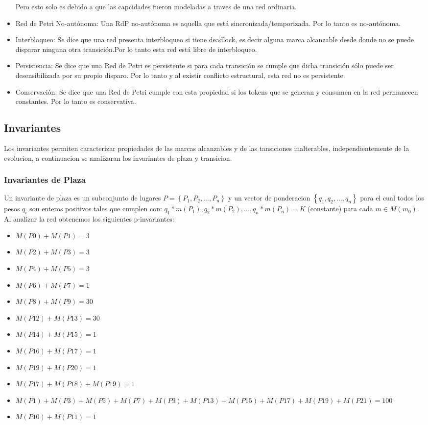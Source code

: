 \documentclass{article}
\begin{document}
\begin{itemize}
		Pero esto solo es debido a que las capcidades fueron modeladas a traves de una red ordinaria.
		\item Red de Petri No-autónoma: Una RdP no-autónoma es aquella que está 
		sincronizada/temporizada. Por lo tanto es no-autónoma.
		\item Interbloqueo: Se dice que una red presenta interbloqueo si tiene deadlock, 
		es decir alguna marca alcanzable desde donde no se puede disparar ninguna otra 
		transición.Por lo tanto esta red está libre de interbloqueo.
		\item Persistencia: Se dice que una Red de Petri es persistente si para cada 
		transición se cumple que dicha transición sólo puede ser desensibilizada por 
		su propio disparo. Por lo tanto y al existir conflicto estructural, esta red 
		no es persistente.
		\item Conservación: Se dice que una Red de Petri cumple con esta propiedad si 
		los tokens que se generan y consumen en la red permanecen constantes. Por lo 
		tanto es conservativa.
	\end{itemize}
	\subsection{Invariantes}
	Los invariantes permiten caracterizar propiedades de las marcas alcanzables
	y de las tansiciones inalterables, independientemente de la evolucion, a continuacion se analizaran los invariantes de plaza y transicion.
		\subsubsection{Invariantes de Plaza}
		Un invariante de plaza es un subconjunto de lugares $P=\left\lbrace P_1,P_2,...,P_n \right\rbrace$ y un vector de ponderacion $\left\lbrace q_1,q_2,..., q_n \right\rbrace$ para el cual todos los pesos $q_i$ son enteros positivos tales que cumplen con:\newline
		$q_1*m(P_1),q_2*m(P_2),..., q_n*m(P_n)=K$ (constante) para cada $m\in M(m_0)$.\newline 
		Al analizar la red obtenemos los siguientes p-invariantes:
		\begin{itemize}
		\item $M(P0)+M(P1)=3$
		\item $M(P2)+M(P3)=3$
		\item $M(P4)+M(P5)=3$
		\item $M(P6)+M(P7)=1$
		\item $M(P8)+M(P9)=30$
		\item $M(P12)+M(P13)=30$
		\item $M(P14)+M(P15)=1$
		\item $M(P16)+M(P17)=1$
		\item $M(P19)+M(P20)=1$
		\item $M(P17)+M(P18)+M(P19)=1$
		\item $M(P1)+M(P3)+M(P5)+M(P7)+M(P9)+M(P13)+M(P15)+M(P17)+M(P19)+M(P21)=100$
		\item $M(P10)+M(P11)=1$
		\end{itemize}		
\end{document}

